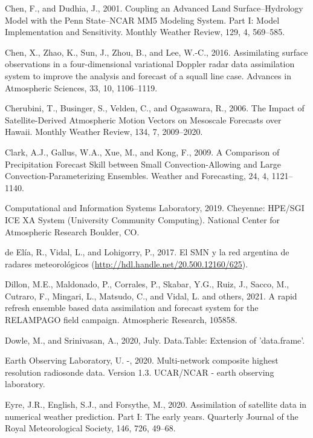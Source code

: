\documentclass[12pt,twoside]{reedthesis}
\begin{document}
\leavevmode\hypertarget{ref-chen2001}{}%
Chen, F., and Dudhia, J., 2001. Coupling an Advanced Land Surface--Hydrology Model with the Penn State--NCAR MM5 Modeling System. Part I: Model Implementation and Sensitivity. Monthly Weather Review, 129, 4, 569--585.

\leavevmode\hypertarget{ref-chen2016}{}%
Chen, X., Zhao, K., Sun, J., Zhou, B., and Lee, W.-C., 2016. Assimilating surface observations in a four-dimensional variational Doppler radar data assimilation system to improve the analysis and forecast of a squall line case. Advances in Atmospheric Sciences, 33, 10, 1106--1119.

\leavevmode\hypertarget{ref-cherubini2006}{}%
Cherubini, T., Businger, S., Velden, C., and Ogasawara, R., 2006. The Impact of Satellite-Derived Atmospheric Motion Vectors on Mesoscale Forecasts over Hawaii. Monthly Weather Review, 134, 7, 2009--2020.

\leavevmode\hypertarget{ref-clark2009}{}%
Clark, A.J., Gallus, W.A., Xue, M., and Kong, F., 2009. A Comparison of Precipitation Forecast Skill between Small Convection-Allowing and Large Convection-Parameterizing Ensembles. Weather and Forecasting, 24, 4, 1121--1140.

\leavevmode\hypertarget{ref-Cheyenne2019}{}%
Computational and Information Systems Laboratory, 2019. Cheyenne: HPE/SGI ICE XA System (University Community Computing). National Center for Atmospheric Research Boulder, CO.

\leavevmode\hypertarget{ref-deelia2017}{}%
de Elía, R., Vidal, L., and Lohigorry, P., 2017. El SMN y la red argentina de radares meteorológicos (\url{http://hdl.handle.net/20.500.12160/625}).

\leavevmode\hypertarget{ref-dillon2021}{}%
Dillon, M.E., Maldonado, P., Corrales, P., Skabar, Y.G., Ruiz, J., Sacco, M., Cutraro, F., Mingari, L., Matsudo, C., and Vidal, L. and others, 2021. A rapid refresh ensemble based data assimilation and forecast system for the RELAMPAGO field campaign. Atmospheric Research, 105858.

\leavevmode\hypertarget{ref-dowle2020}{}%
Dowle, M., and Srinivasan, A., 2020, July. Data.Table: Extension of 'data.frame'.

\leavevmode\hypertarget{ref-sondeos}{}%
Earth Observing Laboratory, U. -, 2020. Multi-network composite highest resolution radiosonde data. Version 1.3. UCAR/NCAR - earth observing laboratory.

\leavevmode\hypertarget{ref-eyre2020}{}%
Eyre, J.R., English, S.J., and Forsythe, M., 2020. Assimilation of satellite data in numerical weather prediction. Part I: The early years. Quarterly Journal of the Royal Meteorological Society, 146, 726, 49--68.
\end{document}
